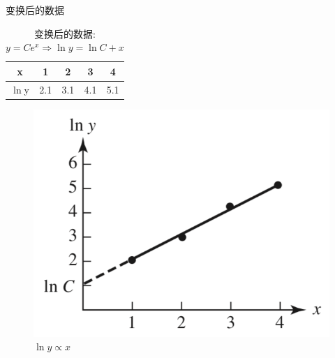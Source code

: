 \documentclass[UTF8]{ctexbeamer}
\begin{document}
\begin{frame}{变换后的数据}

  \begin{table}
    \begin{tabular}{c|cccc}
      x & 1 & 2 & 3 & 4\\
      \hline{}
      $\ln{}$y & 2.1 & 3.1 & 4.1 & 5.1
    \end{tabular}
    \caption{变换后的数据: $y = Ce^x \Rightarrow \ln y = \ln C + x$}
  \end{table}

  \begin{figure}
    \includegraphics[height=.4\textheight{}]{lny.png}
    \caption{$\ln{}y \propto x$}
  \end{figure}
\end{frame}
\end{document}
